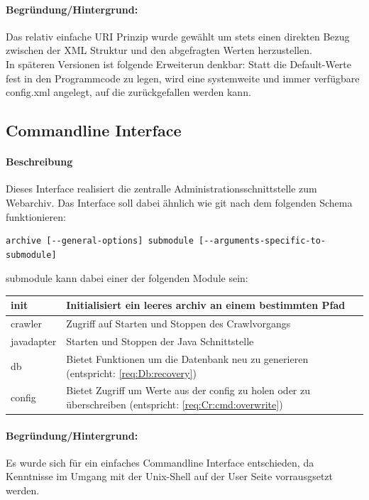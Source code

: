 \paragraph{Begründung/Hintergrund:}
\label{par:begr_ndung}
Das relativ einfache URI Prinzip wurde gewählt um stets einen direkten
Bezug zwischen der XML Struktur und den abgefragten Werten herzustellen.
\\
In späteren Versionen ist folgende Erweiterun denkbar: Statt die
Default-Werte fest in den Programmcode zu legen, wird eine systemweite
und immer verfügbare config.xml angelegt, auf die zurückgefallen werden
kann.



\subsection{Commandline Interface}
\label{sub:commandline_interface}
\paragraph{Beschreibung}
\label{par:beschreibung}
Dieses Interface realisiert die zentralle Administrationsschnittstelle zum Webarchiv. 
Das Interface soll dabei ähnlich wie git nach dem folgenden Schema funktionieren:
\begin{verbatim}
archive [--general-options] submodule [--arguments-specific-to-submodule]
\end{verbatim}
submodule kann dabei einer der folgenden Module sein:
\begin{table}[h]
\centering
\begin{tabular}{|l|l|}
    \hline
        init & Initialisiert ein leeres archiv an einem bestimmten Pfad \\
    \hline
        crawler & Zugriff auf Starten und Stoppen des Crawlvorgangs \\
    \hline
        javadapter & Starten und Stoppen der Java Schnittstelle \\
    \hline
    db & Bietet Funktionen um die Datenbank neu zu generieren
    (entspricht: \ref{req:Db:recovery}) \\
    \hline
        config & Bietet Zugriff um Werte aus der config zu holen oder zu überschreiben
        (entspricht: \ref{req:Cr:cmd:overwrite}) \\
    \hline
\end{tabular}
\end{table}

\paragraph{Begründung/Hintergrund:}
\label{par:begr_ndung_}
Es wurde sich für ein einfaches Commandline Interface entschieden, da
Kenntnisse im Umgang mit der Unix-Shell auf der User Seite vorrausgsetzt
werden.

